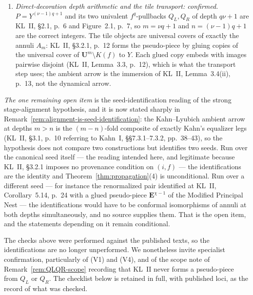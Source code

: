 \documentclass[11pt,reqno]{amsart}
\theoremstyle{definition}
\theoremstyle{remark}
\begin{document}
\begin{enumerate}
  annuli comes from Definition~7.1(3), p.~36, Lemma~7.9, p.~40 and the
  properness statement at \S7.3.2, p.~42, as now argued in the proof
  rather than asserted.  The immersion hypothesis that Lemma~7.8,
  p.~40 requires for the set-theoretic equalizer to be the pullback in
  the category of complex $1$-manifolds is regenerated at every stage
  (Proposition~\ref{prop:base-change}(6),
  Remark~\ref{rem:openness-regenerates-immersion}).
\item[(V4)] \emph{Direct-decoration depth arithmetic and the tile
  transport: confirmed.}  $P=Y^{(\nu-1)q+1}$ and its two univalent
  $f^{q}$-pullbacks $Q_{L},Q_{R}$ of depth $q\nu+1$ are KL~II, \S2.1,
  p.~6 and Figure~2.1, p.~7, so $m=\nu q+1$ and $n=(\nu-1)q+1$ are the
  correct integers.  The tile objects are universal covers of exactly
  the annuli $A_{m}$: KL~II, \S3.2.1, p.~12 forms the pseudo-piece by
  gluing copies of the universal cover of
  $\mathbf U^{m}\setminus K(f)$ to $Y$.  Each glued copy embeds with
  images pairwise disjoint (KL~II, Lemma~3.3, p.~12), which is what the
  transport step uses; the ambient arrow is the immersion of KL~II,
  Lemma~3.4(ii), p.~13, not the dynamical arrow.
\end{enumerate}

\emph{The one remaining open item} is the seed-identification reading
of the strong stage-alignment hypothesis, and it is now stated sharply
in Remark~\ref{rem:alignment-is-seed-identification}: the
Kahn--Lyubich ambient arrow at depths $m>n$ is the $(m-n)$-fold
composite of exactly Kahn's equalizer legs (KL~II, \S3.1, p.~10
referring to Kahn~I, \S\S7.3.1--7.3.2, pp.~38--43), so the hypothesis
does not compare two constructions but identifies two seeds.  Run over
the canonical seed itself --- the reading intended here, and legitimate
because KL~II, \S3.2.1 imposes no provenance condition on $(i,f)$ ---
the identifications are the identity and
Theorem~\ref{thm:propagation}(4) is unconditional.  Run over a
different seed --- for instance the renormalized pair identified at
KL~II, Corollary~5.14, p.~24 with a glued pseudo-piece
$\mathbf E^{\chi-1}$ of the Modified Principal Nest --- the
identifications would have to be conformal isomorphisms of annuli at
both depths simultaneously, and no source supplies them.  That is the
open item, and the statements depending on it remain conditional.

The checks above were performed against the published texts, so the
identifications are no longer unperformed.  We nonetheless invite
specialist confirmation, particularly of (V1) and (V4), and of the
scope note of Remark~\ref{rem:QLQR-scope} recording that KL~II never
forms a pseudo-piece from $Q_{L}$ or $Q_{R}$.  The checklist below is
retained in full, with published loci, as the record of what was
checked.
\end{document}
